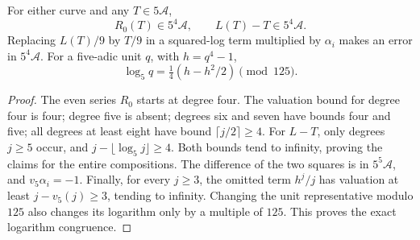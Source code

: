 \begin{lemma}
\label{su-sharp-tail}
For either curve and any \(T\in5\mathcal A\),
\[
 R_0(T)\in5^4\mathcal A,\qquad L(T)-T\in5^4\mathcal A.
\]
Replacing \(L(T)/9\) by \(T/9\) in a squared-log term multiplied
by \(\alpha_i\) makes an error in \(5^4\mathcal A\).
For a five-adic unit \(q\), with \(h=q^4-1\),
\begin{equation}
 \log_5q=\tfrac14(h-h^2/2)\pmod{125}.
 \label{su-unit-log}
\end{equation}
\end{lemma}
\begin{proof}
The even series \(R_0\) starts at degree four. The valuation bound
for degree four is four; degree five is absent; degrees six and
seven have bounds four and five; all degrees at least eight have
bound \(\lceil j/2\rceil\ge4\). For \(L-T\), only degrees
\(j\ge5\) occur, and \(j-\lfloor\log_5j\rfloor\ge4\).
Both bounds tend to infinity, proving the claims for the entire
compositions. The difference of the two squares is in
\(5^5\mathcal A\), and \(v_5\alpha_i=-1\).
Finally, for every \(j\ge3\), the omitted term \(h^j/j\) has
valuation at least \(j-v_5(j)\ge3\), tending to infinity.
Changing the unit representative modulo \(125\) also changes its
logarithm only by a multiple of \(125\). This proves the exact
logarithm congruence.
\end{proof}

